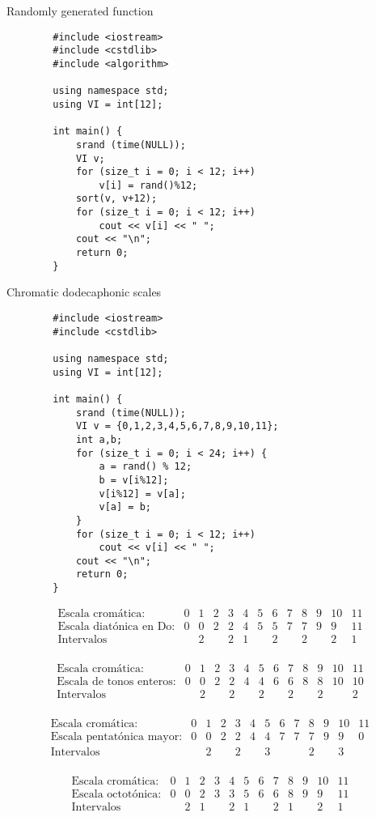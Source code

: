         Randomly generated function
        \begin{lstlisting}
        #include <iostream>
        #include <cstdlib>
        #include <algorithm>
        
        using namespace std;
        using VI = int[12];
        
        int main() {
        	srand (time(NULL));
        	VI v;
        	for (size_t i = 0; i < 12; i++)
        		v[i] = rand()%12;
        	sort(v, v+12);
        	for (size_t i = 0; i < 12; i++)
        		cout << v[i] << " ";
        	cout << "\n";
        	return 0;
        }        
        \end{lstlisting}

        Chromatic dodecaphonic scales
        \begin{lstlisting}
        #include <iostream>
        #include <cstdlib>
        
        using namespace std;
        using VI = int[12];
        
        int main() {
        	srand (time(NULL));
        	VI v = {0,1,2,3,4,5,6,7,8,9,10,11};
        	int a,b;
        	for (size_t i = 0; i < 24; i++) {
        		a = rand() % 12;
        		b = v[i%12];
        		v[i%12] = v[a];
        		v[a] = b;
        	}
        	for (size_t i = 0; i < 12; i++)
        		cout << v[i] << " ";
        	cout << "\n";
        	return 0;
        }        
        \end{lstlisting}

        $$\left.\begin{matrix}
        \text{Escala cromática:}&0&1&2&3&4&5&6&7&8&9&10&11\\
        \text{Escala diatónica en Do:}&0&0&2&2&4&5&5&7&7&9&9&11\\
        \text{Intervalos}&&2&&2&1&&2&&2&&2&1\\
        \end{matrix}\right.$$

        $$\left.\begin{matrix}
        \text{Escala cromática:}&0&1&2&3&4&5&6&7&8&9&10&11\\
        \text{Escala de tonos enteros:}&0&0&2&2&4&4&6&6&8&8&10&10\\
        \text{Intervalos}&&2&&2&&2&&2&&2&&2\\
        \end{matrix}\right.$$

        $$\left.\begin{matrix}
        \text{Escala cromática:}&0&1&2&3&4&5&6&7&8&9&10&11\\
        \text{Escala pentatónica mayor:}&0&0&2&2&4&4&7&7&7&9&9&0\\
        \text{Intervalos}&&2&&2&&3&&&2&&3&\\
        \end{matrix}\right.$$
        
        $$\left.\begin{matrix}
        \text{Escala cromática:}&0&1&2&3&4&5&6&7&8&9&10&11\\
        \text{Escala octotónica:}&0&0&2&3&3&5&6&6&8&9&9&11\\
        \text{Intervalos}&&2&1&&2&1&&2&1&&2&1\\
        \end{matrix}\right.$$
